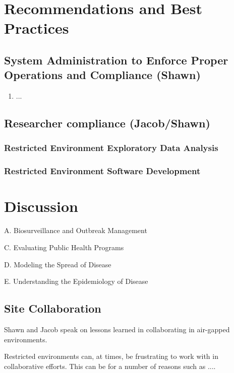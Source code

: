 \documentclass{amia}
\begin{document}
\section*{Recommendations and Best Practices}

\subsection{System Administration to Enforce Proper Operations and Compliance (Shawn)}

        \begin{enumerate}
            \item ...
        \end{enumerate}


\subsection{Researcher compliance (Jacob/Shawn)}
        
\subsubsection{Restricted Environment Exploratory Data Analysis}

\subsubsection{Restricted Environment Software Development }

\section*{Discussion}

A. Biosurveillance and Outbreak Management 

C. Evaluating Public Health Programs 

D. Modeling the Spread of Disease 

E. Understanding the Epidemiology of Disease 

\subsection*{Site Collaboration}

Shawn and Jacob speak on lessons learned in collaborating in air-gapped environments. 

Restricted environments can, at times, be frustrating to work with in collaborative efforts. This can be for a number of reasons such as ....
\end{document}
